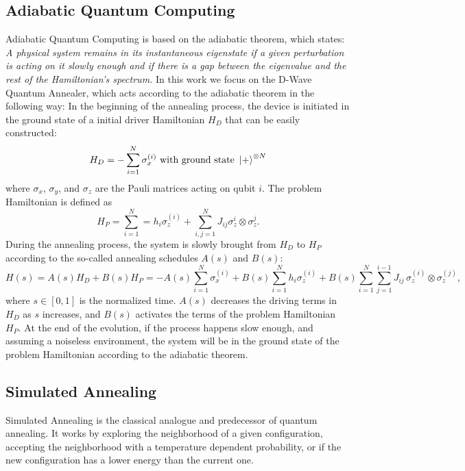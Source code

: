 \documentclass[10pt,a4paper]{article}
\begin{document}
\subsection{Adiabatic Quantum Computing}
 Adiabatic Quantum Computing is based on the adiabatic theorem, which states: \textit{A physical system remains in its instantaneous eigenstate if a given perturbation is acting on it slowly enough and if there is a gap between the eigenvalue and the rest of the Hamiltonian's spectrum.}
In this work we focus on the D-Wave Quantum Annealer, which acts according to the adiabatic theorem in the following way: 
In the beginning of the annealing process, the device is initiated in the ground state of a initial driver Hamiltonian $H_D$ that can be easily constructed:
\begin{equation}
H_D=-\sum_{i=1}^N \sigma_x^{(i)} \text{ with ground state } \ket{+}^{\otimes N}
\end{equation}
where $\sigma_x$, $\sigma_y$, and $\sigma_z$ are the Pauli matrices acting on qubit $i$. The problem Hamiltonian is defined as 
\begin{equation}
H_P=\sum_{i=1}^N=h_i\sigma_z^{(i)}+\sum_{i,j=1}^N J_{ij}\sigma_z^{i}\otimes\sigma_z^{j}.
\end{equation}
During the annealing process, the system is slowly brought from $H_D$ to $H_P$
according to the so-called annealing schedules $A(s)$ and $B(s)$:
\begin{equation}
H(s) = A(s)H_D + B(s)H_P
= -A(s)\sum_{i=1}^{N} \sigma_x^{(i)}
+ B(s)\sum_{i=1}^{N} h_i \sigma_z^{(i)}
+ B(s)\sum_{i=1}^{N}\sum_{j=1}^{i-1} J_{ij}\, \sigma_z^{(i)} \otimes \sigma_z^{(j)},
\label{eq:annealing_hamiltonian}
\end{equation}
where $s \in [0,1]$ is the normalized time. $A(s)$ decreases the driving terms in $H_D$ as $s$ increases,
and $B(s)$ activates the terms of the problem Hamiltonian $H_P$. At the end of the evolution, if the process happens slow enough, and assuming a noiseless environment, the system will be in the ground state of the problem Hamiltonian according to the adiabatic theorem.
\subsection{Simulated Annealing}
Simulated Annealing is the classical analogue and predecessor of quantum annealing. It works by exploring the neighborhood of a given configuration, accepting the neighborhood with a temperature dependent probability, or if the new configuration has a lower energy than the current one. 
\end{document}
